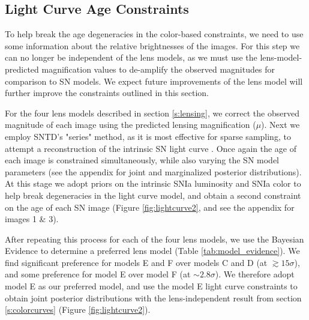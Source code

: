 \documentclass[twocolumn]{aastex63}
\begin{document}
\subsection{Light Curve Age Constraints}
\label{s:lightcurves}

To help break the age degeneracies in the color-based constraints, we need to use some information about the relative brightnesses of the \SNABC images.  For this step we can no longer be independent of the lens models, as we must use the lens-model-predicted magnification values to de-amplify the observed magnitudes for comparison to SN models. We expect future improvements of the lens model will further improve the constraints outlined in this section. 

For the four lens models described in section \ref{s:lensing}, we correct the observed magnitude of each image using the predicted lensing magnification ($\mu$). Next we employ SNTD's "series" method, as it is most effective for sparse sampling, to attempt a reconstruction of the intrinsic SN light curve \citep{pierel_turning_2019}. Once again the age of each image is constrained simultaneously, while also varying the SN model parameters (see the appendix for joint and marginalized posterior distributions). At this stage we adopt priors on the intrinsic SNIa luminosity \citep{rodney_type_2014} and SNIa color \citep{mosher_cosmological_2014} to help break degeneracies in the light curve model, and obtain a second constraint on the age of each SN image (Figure \ref{fig:lightcurve2}, and see the appendix for images 1 \& 3). 

After repeating this process for each of the four lens models, we use the Bayesian Evidence to determine a preferred lens model (Table \ref{tab:model_evidence}). We find significant preference for models E and F over models C and D (at $\gtrsim15\sigma$), and some preference for model E over model F (at $\sim2.8\sigma$). We therefore adopt model E as our preferred model, and use the model E light curve constraints to obtain joint posterior distributions with the lens-independent result from section \ref{s:colorcurves} (Figure \ref{fig:lightcurve2}). 
\end{document}
